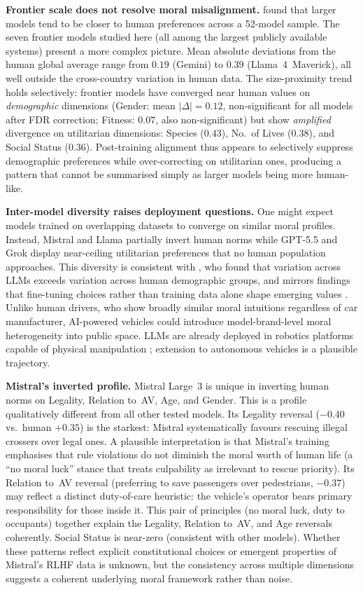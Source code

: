 \documentclass[letterpaper]{article}
\begin{document}
\textbf{Frontier scale does not resolve moral misalignment.}
\citet{ahmad2025} found that larger models tend to be closer to human preferences
across a 52-model sample. The seven frontier models studied here (all among the
largest publicly available systems) present a more complex picture. Mean absolute
deviations from the human global average range from $0.19$ (Gemini) to $0.39$
(Llama~4~Maverick), all well outside the cross-country variation in human data.
The size-proximity trend holds selectively: frontier models have converged near
human values on \emph{demographic} dimensions (Gender: mean $|\Delta|{=}0.12$,
non-significant for all models after FDR correction; Fitness: $0.07$, also
non-significant) but show \emph{amplified} divergence on utilitarian dimensions:
Species ($0.43$), No.\ of Lives ($0.38$), and Social Status ($0.36$).
Post-training alignment thus appears to selectively suppress
demographic preferences while over-correcting on utilitarian ones, producing a
pattern that cannot be summarised simply as larger models being more human-like.

\textbf{Inter-model diversity raises deployment questions.}
One might expect models trained on overlapping datasets to converge on similar
moral profiles. Instead, Mistral and Llama partially invert human norms while
GPT-5.5 and Grok display near-ceiling utilitarian preferences that no human
population approaches. This diversity is consistent with \citet{kirgis2024}, who
found that variation across LLMs exceeds variation across human demographic
groups, and mirrors findings that fine-tuning choices rather than training data
alone shape emerging values \citep{santurkar2023}. Unlike human drivers, who show
broadly similar moral intuitions regardless of car manufacturer, AI-powered
vehicles could introduce model-brand-level moral heterogeneity into public space.
LLMs are already deployed in robotics platforms capable of physical manipulation
\citep{brohan2023,driess2023,paligemma}; extension to autonomous vehicles is a
plausible trajectory.

\textbf{Mistral's inverted profile.}
Mistral Large~3 is unique in inverting human norms on Legality, Relation to~AV,
Age, and Gender.
This is a profile qualitatively different from all other tested models.
Its Legality reversal ($-0.40$ vs.\ human $+0.35$) is the starkest: Mistral
systematically favours rescuing illegal crossers over legal ones.
A plausible interpretation is that Mistral's training emphasises that rule
violations do not diminish the moral worth of human life (a ``no moral luck''
stance that treats culpability as irrelevant to rescue priority).
Its Relation to~AV reversal (preferring to save passengers over pedestrians,
$-0.37$) may reflect a distinct duty-of-care heuristic: the vehicle's operator
bears primary responsibility for those inside it.
This pair of principles (no moral luck, duty to occupants) together explain the
Legality, Relation to~AV, and Age reversals coherently.
Social Status is near-zero (consistent with other models).
Whether these patterns reflect explicit constitutional choices or emergent
properties of Mistral's RLHF data is unknown, but the consistency across
multiple dimensions suggests a coherent underlying moral framework rather
than noise.
\end{document}
